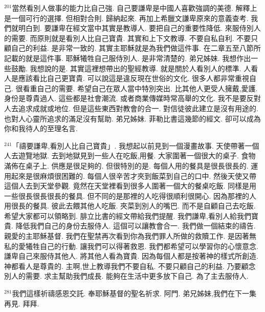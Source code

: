 \documentclass{book}
\begin{document}
$^{201}$當然看別人做事的能力比自己強.
自己要謙卑是中國人喜歡強調的美德.
解釋上是一個可行的選擇.
但相對合則.
歸納起來.
再加上希臘文謙卑原來的意義查考.
我們就明白到.
要謙卑在經文當中其實是教導人.
要把自己的重要性降低.
來服侍別人的需要.
而原則就是看別人比自己寶貴.
其實和上下文教導.
不要自私自利.
不要只顧自己的利益.
是非常一致的.
其實主耶穌就是為我們做這件事.
在二章五至八節所記載的就是這件事.
耶穌犧牲自己服侍別人.
是非常清楚的.
弟兄姊妹.
我想作出一些鼓勵.
我想說的是.
其實這裡想帶出的聖經教導.
就是關於人看別人的標準.
人看人是應該看比自己更寶貴.
可以說這是違反現在世俗的文化.
很多人都非常重視自己.
很看重自己的需要.
希望自己在眾人當中特別突出.
比其他人更受人擁戴,愛護.
身份是尊貴過人.
這些都是社會潮流.
或者商業傳媒時常高舉的文化.
我不是要反對人去追求成就或地位.
但是這些東西對教會的合一.
對信徒彼此建立是沒有用途的.
也對人心靈所追求的滿足沒有幫助.
弟兄姊妹.
菲勒比書這幾節的經文.
卻可以成為你和我待人的至理名言.

$^{241}$「禱要謙卑,看別人比自己寶貴」.
我想起以前見到一個漫畫故事.
天使帶著一個人去遊覽地獄.
去到地獄見到一些人在吃飯,用餐.
大家圍著一個很大的桌子.
食物滿佈在桌子上.
供應是很足夠的.
但很特別的是.
每個人用的餐具是很長很長的.
運用起來是很麻煩很困難的.
每個人很辛苦才夾到飯菜到自己的口中.
然後天使又帶這個人去到天堂參觀.
竟然在天堂裡看到很多人圍著一個大的餐桌吃飯.
同樣是用一些很長很長很長的餐具.
但不同的是那裡的人吃得很順利很開心.
因為那裡的人用很長的餐具.
彼此去餵其他人吃飯.
夾菜到別人的嘴巴.
而不是自顧自己去吃飯.
希望大家都可以領略到.
腓立比書的經文帶給我們提醒.
我們謙卑,看別人給我們寶貴.
降低我們自己的身份去服侍人.
這個可以讓教會合一.
我們做一個結束的禱告.
親愛的主耶穌基督.
我們在聖禁再次看到你為我們罪人所做的救贖工作.
是因著無私的愛犧牲自己的行動.
讓我們可以得著救恩.
我們都希望可以學習你的心懷意念.
謙卑自己來服侍其他人.
將其他人看為寶貴.
因為每個人都是按著神的樣式所創造.
神都看人是尊貴的.
主啊,世上教導我們不要自私.
不要只顧自己的利益.
乃要顧念別人的需要.
求主幫助我們成長.
能夠在生活中更多放下自己.
為了主去服侍人.

$^{281}$我們這樣祈禱感恩交託.
奉耶穌基督的聖名祈求.
阿門.
弟兄姊妹,我們在下一集再見.
拜拜.
\newpage
\end{document}
